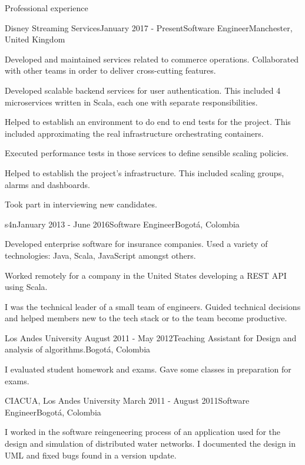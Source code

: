 \documentclass{resume} %
\def\uniandes{Los Andes University }
\begin{document}
\begin{rSection}{Professional experience}

\begin{rSubsection}{Disney Streaming Services}{January 2017 - Present}{Software Engineer}{Manchester, United Kingdom}
\item Developed and maintained services related to commerce operations. Collaborated with other teams in order to deliver cross-cutting features.
\item Developed scalable backend services for user authentication. This included 4 microservices written in Scala, each one with separate responsibilities.
\item Helped to establish an environment to do end to end tests for the project. This included approximating the real infrastructure orchestrating containers.
\item Executed performance tests in those services to define sensible scaling policies.
\item Helped to establish the project's infrastructure. This included scaling groups, alarms and dashboards.
\item Took part in interviewing new candidates.
\end{rSubsection}

\begin{rSubsection}{s4n}{January 2013 - June 2016}{Software Engineer}{Bogot\'a, Colombia}
\item Developed enterprise software for insurance companies. Used a variety of technologies: Java, Scala, JavaScript amongst others.
\item Worked remotely for a company in the United States developing a REST API using Scala.
\item I was the technical leader of a small team of engineers. Guided technical decisions and helped members new to the tech stack or to the team become productive.
\end{rSubsection}


\begin{rSubsection}{\uniandes}{August 2011 - May 2012}{Teaching Assistant for Design and analysis of algorithms.}{Bogot\'a, Colombia}
\item I evaluated student homework and exams. Gave some classes in preparation for exams.
\end{rSubsection}


\begin{rSubsection}{CIACUA, \uniandes}{March 2011 - August 2011}{Software Engineer}{Bogot\'a, Colombia}
\item I worked in the software reingeneering process of an application used for the design and simulation of distributed water networks. I documented the design in UML and fixed bugs found in a version update.
\end{rSubsection}

\end{rSection}
\end{document}
